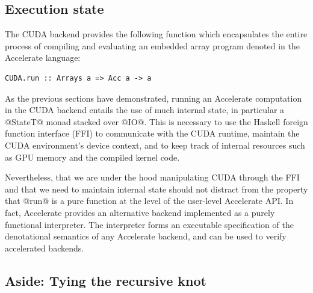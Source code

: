 %


\subsection{Execution state}

The CUDA backend provides the following function which encapsulates the entire
process of compiling and evaluating an embedded array program denoted in the
Accelerate language:
%
\begin{lstlisting}[style=haskell]
CUDA.run :: Arrays a => Acc a -> a
\end{lstlisting}
%
As the previous sections have demonstrated, running an Accelerate computation in
the CUDA backend entails the use of much internal state, in particular a
@StateT@ monad stacked over @IO@. This is necessary to use the Haskell foreign
function interface (FFI) to communicate with the CUDA runtime, maintain the
CUDA environment's device context, and to keep track of internal resources such
as GPU memory and the compiled kernel code.

Nevertheless, that we are under the hood manipulating CUDA through the FFI and
that we need to maintain internal state should not distract from the property
that @run@ is a pure function at the level of the user-level Accelerate
API\@. In fact, Accelerate provides an alternative backend implemented as a purely
functional interpreter. The interpreter forms an executable specification of the
denotational semantics of any Accelerate backend, and can be used to verify
accelerated backends.


\subsection{Aside: Tying the recursive knot}
\label{sec:knot_tying}


